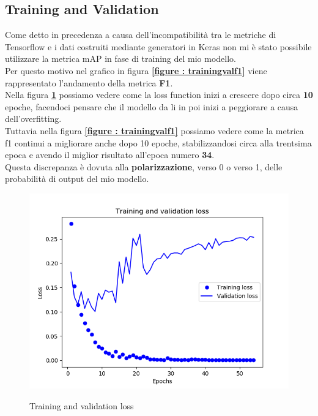 \subsection{Training and Validation}
Come detto in precedenza a causa dell'incompatibilità tra le metriche di Tensorflow e i dati costruiti mediante generatori in Keras non mi è stato possibile  utilizzare la metrica mAP in fase di training del mio modello.
\\Per questo motivo nel grafico in figura \textbf{\ref{figure : trainingvalf1}} viene rappresentato l'andamento della metrica \textbf{F1}.
\\Nella figura \textbf{\ref{figure : trainingvalloss}} possiamo vedere come la loss function inizi a crescere dopo circa \textbf{10} epoche, facendoci pensare che il modello da li in poi inizi a peggiorare a causa dell'overfitting.
\\Tuttavia nella figura \textbf{\ref{figure : trainingvalf1}} possiamo vedere come la metrica f1 continui a migliorare anche dopo 10 epoche, stabilizzandosi circa alla trentsima epoca e avendo il miglior risultato all'epoca numero \textbf{34}.
\\Questa discrepanza è dovuta alla \textbf{polarizzazione}, verso 0 o verso 1, delle probabilità di output del mio modello.
\begin{figure}[ht]
\centering
\caption{Training and validation loss}
\includegraphics[width=\linewidth]{img/training-validation-loss.png}
\label{figure : trainingvalloss}
\end{figure}
